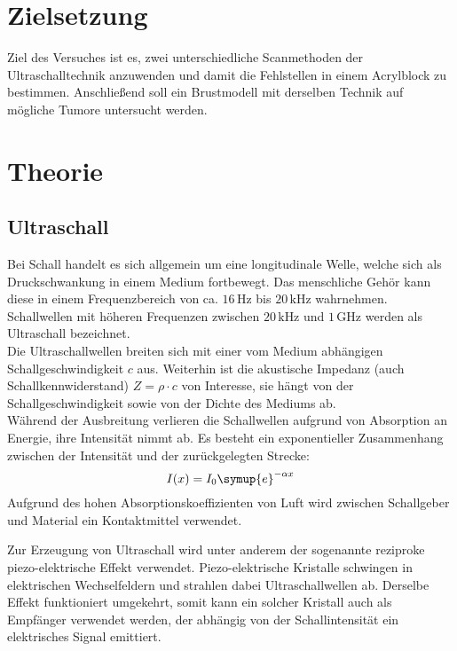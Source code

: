 \section{Zielsetzung}
Ziel des Versuches ist es, zwei unterschiedliche Scanmethoden der Ultraschalltechnik anzuwenden
und damit die Fehlstellen in einem Acrylblock zu bestimmen.
Anschließend soll ein Brustmodell mit derselben Technik auf mögliche Tumore untersucht werden.

\section{Theorie}
\label{sec:Theorie}

\subsection{Ultraschall}
\label{sec:Ultraschall}

Bei Schall handelt es sich allgemein um eine longitudinale Welle, welche sich als Druckschwankung
in einem Medium fortbewegt.
Das menschliche Gehör kann diese in einem Frequenzbereich von ca. $16\,\unit{\hertz}$ bis $20\,\unit{\kilo\hertz}$
wahrnehmen. Schallwellen mit höheren Frequenzen zwischen $20\,\unit{\kilo\hertz}$ und $1\,\unit{\giga\hertz}$ werden als
Ultraschall bezeichnet. \\
Die Ultraschallwellen breiten sich mit einer vom Medium abhängigen Schallgeschwindigkeit $c$ aus.
Weiterhin ist die akustische Impedanz (auch Schallkennwiderstand) $Z=\rho \cdot c$ von Interesse, sie hängt
von der Schallgeschwindigkeit sowie von der Dichte des Mediums ab. \\
Während der Ausbreitung verlieren die Schallwellen aufgrund von Absorption an Energie, ihre Intensität nimmt ab.
Es besteht ein exponentieller Zusammenhang zwischen der Intensität und der zurückgelegten Strecke:
\begin{equation}
    \label{eq:Dämpfung}
    I(x)=I_{0}\symup{e}^{-\alpha x}
\end{equation}
Aufgrund des hohen Absorptionskoeffizienten von Luft wird zwischen Schallgeber und Material ein Kontaktmittel verwendet.

Zur Erzeugung von Ultraschall wird unter anderem der sogenannte reziproke piezo-elektrische Effekt verwendet.
Piezo-elektrische Kristalle schwingen in elektrischen Wechselfeldern und strahlen dabei Ultraschallwellen ab.
Derselbe Effekt funktioniert umgekehrt, somit kann ein solcher Kristall auch als Empfänger verwendet werden,
der abhängig von der Schallintensität ein elektrisches Signal emittiert.

